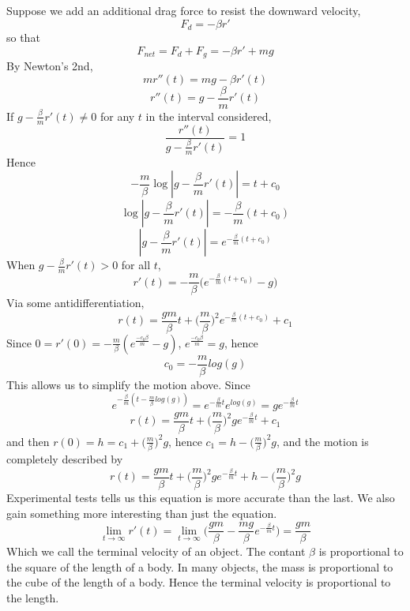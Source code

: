 Suppose we add an additional drag force to resist the downward velocity,
%
\[ F_d = -\beta r' \]
%
so that
%
\[ F_{net} = F_d + F_g = -\beta r' + mg \]
%
By Newton's 2nd,
%
\[ m r''(t) = mg - \beta r'(t) \]
%
\[ r''(t) = g - \frac{\beta}{m} r'(t) \]
%
If $g - \frac{\beta}{m} r'(t) \neq 0$ for any $t$ in the interval considered,
%
\[ \frac{r''(t)}{g - \frac{\beta}{m} r'(t)} = 1 \]
%
Hence
%
\[ - \frac{m}{\beta} \log|g - \frac{\beta}{m} r'(t)| = t + c_0 \]
%
\[ \log|g - \frac{\beta}{m} r'(t)| = - \frac{\beta}{m} (t + c_0) \]
%
\[ |g - \frac{\beta}{m} r'(t)| = e^{-\frac{\beta}{m} (t + c_0)} \]
%
When $g - \frac{\beta}{m} r'(t) > 0$ for all $t$,
%
\[ r'(t) = -\frac{m}{\beta} \big( e^{-\frac{\beta}{m} (t + c_0)} - g \big) \]
%
Via some antidifferentiation,
%
\[ r(t) = \frac{gm}{\beta} t + \big( \frac{m}{\beta} \big)^2 e^{-\frac{\beta}{m} (t + c_0)} + c_1 \]
%
Since $0 = r'(0) = - \frac{m}{\beta} (e^{\frac{-c_0 \beta}{m}} - g)$, $e^{\frac{-c_0 \beta}{m}} = g$, hence
%
\[ c_0 = - \frac{m}{\beta} log(g) \]
%
This allows us to simplify the motion above. Since
%
\[ e^{-\frac{\beta}{m}(t - \frac{m}{\beta}log(g))} = e^{-\frac{\beta}{m}t}e^{log(g)} = ge^{-\frac{\beta}{m}t} \]
%
\[ r(t) = \frac{gm}{\beta} t + \big( \frac{m}{\beta} \big)^2 g e^{-\frac{\beta}{m}t} + c_1 \]
%
and then $r(0) = h = c_1 + \big( \frac{m}{\beta} \big)^2 g $, hence $c_1 = h - \big( \frac{m}{\beta} \big)^2 g$, and the motion is completely described by
%
\[ r(t) = \frac{gm}{\beta} t + \big( \frac{m}{\beta} \big)^2 g e^{-\frac{\beta}{m}t} +  h - \big( \frac{m}{\beta} \big)^2 g \]
%
Experimental tests tells us this equation is more accurate than the last. We also gain something more interesting than just the equation.
%
\[ \lim_{t \to \infty} r'(t) = \lim_{t \to \infty} \big( \frac{gm}{\beta} - \frac{mg}{\beta} e^{- \frac{\beta}{m} t} \big) = \frac{gm}{\beta} \]
%
Which we call the terminal velocity of an object. The contant $\beta$ is proportional to the square of the length of a body. In many objects, the mass is proportional to the cube of the length of a body. Hence the terminal velocity is proportional to the length.

